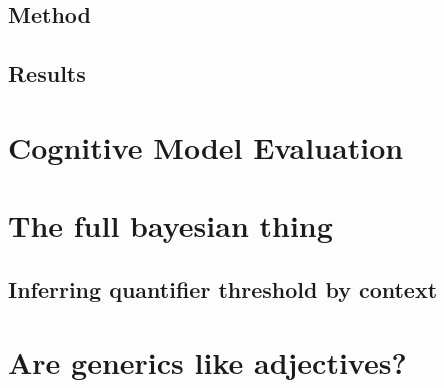 \documentclass[10pt,letterpaper]{article}
\begin{document}
\subsection{Method}

\subsection{Results}

\section{Cognitive Model Evaluation}

\section{The full bayesian thing}

\subsection{Inferring quantifier threshold by context}

\section{Are generics like adjectives?}
\end{document}
